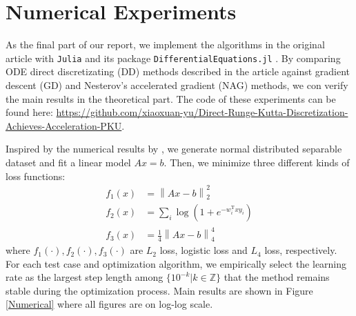 \section{Numerical Experiments}
As the final part of our report, we implement the algorithms in the original article with \texttt{Julia} and its package \texttt{DifferentialEquations.jl} \cite{rackauckas2017differentialequations}. By comparing ODE direct discretizating (DD) methods described in the article against gradient descent (GD) and Nesterov's accelerated gradient (NAG) methods, we con verify the main results in the theoretical part. The code of these experiments can be found here: \url{https://github.com/xiaoxuan-yu/Direct-Runge-Kutta-Discretization-Achieves-Acceleration-PKU}.

Inspired by the numerical results by \textcite{NEURIPS2019_7a2b33c6}, we generate normal distributed separable dataset and fit a linear model \(Ax=b\). Then, we minimize three different kinds of loss functions:
\begin{equation}
    \begin{aligned}
        f_1(x) & = \left\| Ax-b \right\|_{2}^2                \\
        f_2(x) & = \sum_{i}\log(1+e^{-w_i^{\mathrm{T}}x y_i}) \\
        f_3(x) & = \frac{1}{4}\left\| Ax-b \right\|_{4}^4
    \end{aligned}
\end{equation}
where $f_1(\cdot ),f_2(\cdot ),f_3(\cdot )$ are $L_2$ loss, logistic loss and $L_4$ loss, respectively. For each test case and optimization algorithm, we empirically select the learning rate as the largest step length among $\{ 10^{-k}|k\in \mathbb{Z} \}$ that the method remains stable during the optimization process. Main results are shown in Figure \ref{Numerical} where all figures are on log-log scale.
